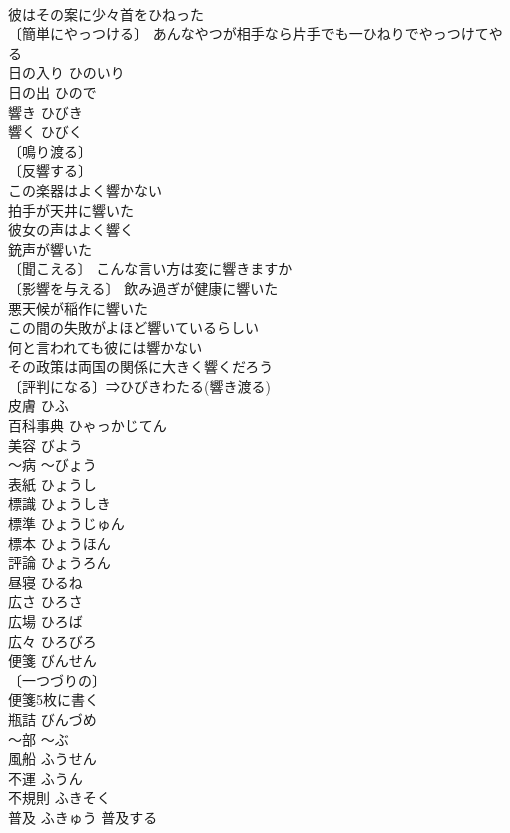 \documentclass[8pt]{extreport}
\begin{document}
\begin{CJK}{UTF8}{min}
\\	彼はその案に少々首をひねった 
\\	〔簡単にやっつける〕 あんなやつが相手なら片手でも一ひねりでやっつけてやる 
\\	日の入り	ひのいり	
\\	日の出	ひので	
\\	響き	ひびき	
\\	響く	ひびく	
\\	〔鳴り渡る〕
\\	〔反響する〕
\\	この楽器はよく響かない 
\\	拍手が天井に響いた 
\\	彼女の声はよく響く 
\\	銃声が響いた 
\\	〔聞こえる〕 こんな言い方は変に響きますか 
\\	〔影響を与える〕 飲み過ぎが健康に響いた 
\\	悪天候が稲作に響いた 
\\	この間の失敗がよほど響いているらしい 
\\	何と言われても彼には響かない 
\\	その政策は両国の関係に大きく響くだろう 
\\	〔評判になる〕⇒ひびきわたる(響き渡る)
\\	皮膚	ひふ	
\\	百科事典	ひゃっかじてん	
\\	美容	びよう	
\\	～病	～びょう	
\\	表紙	ひょうし	
\\	標識	ひょうしき	
\\	標準	ひょうじゅん	
\\	標本	ひょうほん	
\\	評論	ひょうろん	
\\	昼寝	ひるね	
\\	広さ	ひろさ	
\\	広場	ひろば	
\\	広々	ひろびろ	
\\	便箋	びんせん	
\\	〔一つづりの〕
\\	便箋5枚に書く 
\\	瓶詰	びんづめ	
\\	～部	～ぶ	
\\	風船	ふうせん	
\\	不運	ふうん	
\\	不規則	ふきそく	
\\	普及	ふきゅう	普及する 

\end{CJK}
\end{document}
